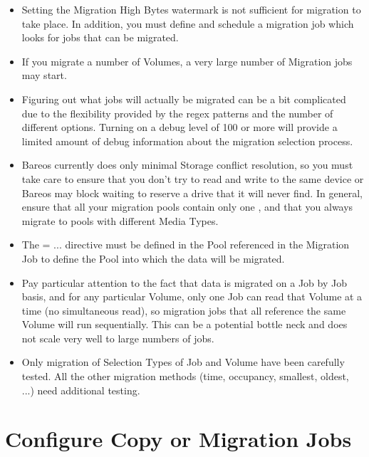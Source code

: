 \begin{itemize}
\item Setting the Migration High Bytes watermark is not sufficient
      for migration to take place. In addition, you must define
      and schedule a migration job which looks for jobs that can
      be migrated.

\item If you migrate a number of Volumes, a very large number of Migration
      jobs may start.

\item Figuring out what jobs will actually be migrated can be a bit complicated
      due to the flexibility provided by the regex patterns and the number of
      different options.  Turning on a debug level of 100 or more will provide
      a limited amount of debug information about the migration selection
      process.

\item Bareos currently does only minimal Storage conflict resolution, so you
      must take care to ensure that you don't try to read and write to the
      same device or Bareos may block waiting to reserve a drive that it
      will never find. In general, ensure that all your migration
      pools contain only one ,
      and that you always
      migrate to pools with different Media Types.

\item The  = ... directive must be defined in the Pool
     referenced in the Migration Job to define the Pool into which the
     data will be migrated.

\item Pay particular attention to the fact that data is migrated on a Job
     by Job basis, and for any particular Volume, only one Job can read
     that Volume at a time (no simultaneous read), so migration jobs that
     all reference the same Volume will run sequentially.  This can be a
     potential bottle neck and does not scale very well to large numbers
     of jobs.

\item Only migration of Selection Types of Job and Volume have
     been carefully tested. All the other migration methods (time,
     occupancy, smallest, oldest, ...) need additional testing.
\end{itemize}

\section{Configure Copy or Migration Jobs}

